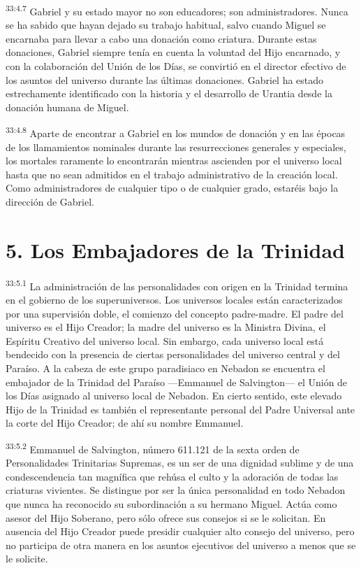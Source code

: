 \par
\textsuperscript{33:4.7} Gabriel y su estado mayor no son educadores; son administradores. Nunca se ha sabido que hayan dejado su trabajo habitual, salvo cuando Miguel se encarnaba para llevar a cabo una donación como criatura. Durante estas donaciones, Gabriel siempre tenía en cuenta la voluntad del Hijo encarnado, y con la colaboración del Unión de los Días, se convirtió en el director efectivo de los asuntos del universo durante las últimas donaciones. Gabriel ha estado estrechamente identificado con la historia y el desarrollo de Urantia desde la donación humana de Miguel.

\par
\textsuperscript{33:4.8} Aparte de encontrar a Gabriel en los mundos de donación y en las épocas de los llamamientos nominales durante las resurrecciones generales y especiales, los mortales raramente lo encontrarán mientras ascienden por el universo local hasta que no sean admitidos en el trabajo administrativo de la creación local. Como administradores de cualquier tipo o de cualquier grado, estaréis bajo la dirección de Gabriel.

\section*{5. Los Embajadores de la Trinidad}
\par
\textsuperscript{33:5.1} La administración de las personalidades con origen en la Trinidad termina en el gobierno de los superuniversos. Los universos locales están caracterizados por una supervisión doble, el comienzo del concepto padre-madre. El padre del universo es el Hijo Creador; la madre del universo es la Ministra Divina, el Espíritu Creativo del universo local. Sin embargo, cada universo local está bendecido con la presencia de ciertas personalidades del universo central y del Paraíso. A la cabeza de este grupo paradisiaco en Nebadon se encuentra el embajador de la Trinidad del Paraíso ---Emmanuel de Salvington--- el Unión de los Días asignado al universo local de Nebadon. En cierto sentido, este elevado Hijo de la Trinidad es también el representante personal del Padre Universal ante la corte del Hijo Creador; de ahí su nombre Emmanuel.

\par
\textsuperscript{33:5.2} Emmanuel de Salvington, número 611.121 de la sexta orden de Personalidades Trinitarias Supremas, es un ser de una dignidad sublime y de una condescendencia tan magnífica que rehúsa el culto y la adoración de todas las criaturas vivientes. Se distingue por ser la única personalidad en todo Nebadon que nunca ha reconocido su subordinación a su hermano Miguel. Actúa como asesor del Hijo Soberano, pero sólo ofrece sus consejos si se le solicitan. En ausencia del Hijo Creador puede presidir cualquier alto consejo del universo, pero no participa de otra manera en los asuntos ejecutivos del universo a menos que se le solicite.


